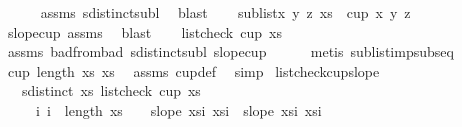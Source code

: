 \begin{isabellebody}
\ \ \ \ \isamarkupfalse%
\ assms{\isacharparenleft}{\kern0pt}{}{\isacharparenright}{\kern0pt}\ sdistinct{\isacharunderscore}{\kern0pt}subl\ \isamarkupfalse%
\ blast\isanewline
\ \ \isamarkupfalse%
\ {\isachardoublequoteopen}sublist{\isacharbrackleft}{\kern0pt}x{\isacharcomma}{\kern0pt}\ y{\isacharcomma}{\kern0pt}\ z{\isacharbrackright}{\kern0pt}\ xs\ {\isasymlongrightarrow}\ cup{}\ x\ y\ z{\isachardoublequoteclose}\ \isamarkupfalse%
\ slope{\isacharunderscore}{\kern0pt}cup{}\ assms{\isacharparenleft}{\kern0pt}{}{\isacharparenright}{\kern0pt}\ \isamarkupfalse%
\ blast\isanewline
\ \ \isamarkupfalse%
\ {\isachardoublequoteopen}list{\isacharunderscore}{\kern0pt}check\ cup{}\ xs{\isachardoublequoteclose}\ \isamarkupfalse%
\ assms{\isacharparenleft}{\kern0pt}{}{\isacharcomma}{\kern0pt}{}{\isacharparenright}{\kern0pt}\ bad{}{\isacharunderscore}{\kern0pt}from{\isacharunderscore}{\kern0pt}bad\ sdistinct{\isacharunderscore}{\kern0pt}subl\ slope{\isacharunderscore}{\kern0pt}cup{}\isanewline
\ \ \ \ \isamarkupfalse%
\ {\isacharparenleft}{\kern0pt}metis\ sublist{\isacharunderscore}{\kern0pt}imp{\isacharunderscore}{\kern0pt}subseq{\isacharparenright}{\kern0pt}\isanewline
\ \ \isamarkupfalse%
\ {\isachardoublequoteopen}cup\ {\isacharparenleft}{\kern0pt}length\ xs{\isacharparenright}{\kern0pt}\ xs{\isachardoublequoteclose}\ \isamarkupfalse%
\ assms\ cup{\isacharunderscore}{\kern0pt}def\ \isamarkupfalse%
\ simp\isanewline
{}\isamarkupfalse%
%
\endisatagproof
{\isafoldproof}%
%
\isadelimproof
\isanewline
%
\endisadelimproof
\isanewline
{}\isamarkupfalse%
\ list{\isacharunderscore}{\kern0pt}check{\isacharunderscore}{\kern0pt}cup{}{\isacharunderscore}{\kern0pt}slope{\isacharcolon}{\kern0pt}\isanewline
\ \ \ {\isachardoublequoteopen}sdistinct\ xs{\isachardoublequoteclose}\ {\isachardoublequoteopen}list{\isacharunderscore}{\kern0pt}check\ cup{}\ xs{\isachardoublequoteclose}\isanewline
\ \ \ \ \ {\isachardoublequoteopen}{\isasymAnd}i{\isachardot}{\kern0pt}\ i\ {\isacharless}{\kern0pt}\ length\ xs\ {\isacharminus}{\kern0pt}\ {}\ {\isasymlongrightarrow}\ slope\ {\isacharparenleft}{\kern0pt}xs{\isacharbang}{\kern0pt}i{\isacharparenright}{\kern0pt}\ {\isacharparenleft}{\kern0pt}xs{\isacharbang}{\kern0pt}{\isacharparenleft}{\kern0pt}i{\isacharplus}{\kern0pt}{}{\isacharparenright}{\kern0pt}{\isacharparenright}{\kern0pt}\ {\isacharless}{\kern0pt}\ slope\ {\isacharparenleft}{\kern0pt}xs{\isacharbang}{\kern0pt}{\isacharparenleft}{\kern0pt}i{\isacharplus}{\kern0pt}{}{\isacharparenright}{\kern0pt}{\isacharparenright}{\kern0pt}\ {\isacharparenleft}{\kern0pt}xs{\isacharbang}{\kern0pt}{\isacharparenleft}{\kern0pt}i{\isacharplus}{\kern0pt}{}{\isacharparenright}{\kern0pt}{\isacharparenright}{\kern0pt}{\isachardoublequoteclose}\isanewline

\end{isabellebody}

